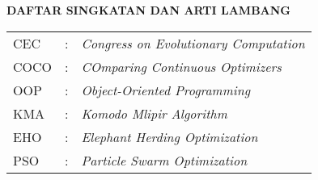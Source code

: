 \clearpage
{}
{}

\begin{center}
    \large \textbf{DAFTAR SINGKATAN DAN ARTI LAMBANG}
\end{center}
\vspace{3em}

\begin{center}
    \begin{table}[htbp]
        \begin{tabular}{l l l}
            CEC            &:& \textit{Congress on Evolutionary Computation} \\ %
            COCO            &:& \textit{COmparing Continuous Optimizers} \\ %
            OOP            &:& \textit{Object-Oriented Programming} \\ %
            KMA            &:& \textit{Komodo Mlipir Algorithm} \\ %
            EHO            &:& \textit{Elephant Herding Optimization} \\ %
            PSO            &:& \textit{Particle Swarm Optimization} \\ %
        \end{tabular}
    \end{table}
\end{center}


